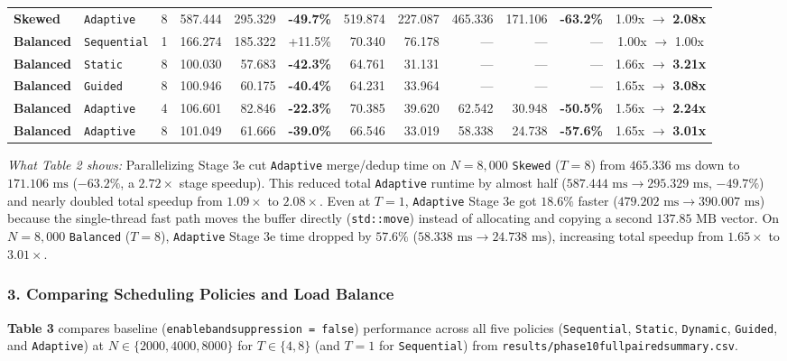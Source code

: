 \documentclass[11pt,a4paper]{article}
\renewcommand{\_}{\textunderscore\allowbreak}
\begin{document}
\begin{table}[H]
{\begin{tabular}{l l r r r r r r r r r c}
\textbf{Skewed} & \texttt{Adaptive} & 8 & 587.444 & 295.329 & \textbf{-49.7\%} & 519.874 & 227.087 & 465.336 & 171.106 & \textbf{-63.2\%} & 1.09x $\to$ \textbf{2.08x} \\
\textbf{Balanced} & \texttt{Sequential} & 1 & 166.274 & 185.322 & +11.5\% & 70.340 & 76.178 & --- & --- & --- & 1.00x $\to$ 1.00x \\
\textbf{Balanced} & \texttt{Static} & 8 & 100.030 & 57.683 & \textbf{-42.3\%} & 64.761 & 31.131 & --- & --- & --- & 1.66x $\to$ \textbf{3.21x} \\
\textbf{Balanced} & \texttt{Guided} & 8 & 100.946 & 60.175 & \textbf{-40.4\%} & 64.231 & 33.964 & --- & --- & --- & 1.65x $\to$ \textbf{3.08x} \\
\textbf{Balanced} & \texttt{Adaptive} & 4 & 106.601 & 82.846 & \textbf{-22.3\%} & 70.385 & 39.620 & 62.542 & 30.948 & \textbf{-50.5\%} & 1.56x $\to$ \textbf{2.24x} \\
\textbf{Balanced} & \texttt{Adaptive} & 8 & 101.049 & 61.666 & \textbf{-39.0\%} & 66.546 & 33.019 & 58.338 & 24.738 & \textbf{-57.6\%} & 1.65x $\to$ \textbf{3.01x} \\
\bottomrule
\end{tabular}%
}
\end{table}

\textit{What Table 2 shows:} Parallelizing Stage 3e cut \texttt{Adaptive} merge/dedup time on $N=8,000$ \texttt{Skewed} ($T=8$) from $465.336\text{ ms}$ down to $171.106\text{ ms}$ ($-63.2\%$, a $2.72\times$ stage speedup). This reduced total \texttt{Adaptive} runtime by almost half ($587.444\text{ ms} \to 295.329\text{ ms}$, $-49.7\%$) and nearly doubled total speedup from $1.09\times$ to $2.08\times$. Even at $T=1$, \texttt{Adaptive} Stage 3e got $18.6\%$ faster ($479.202\text{ ms} \to 390.007\text{ ms}$) because the single-thread fast path moves the buffer directly (\texttt{std::move}) instead of allocating and copying a second $137.85\text{ MB}$ vector. On $N=8,000$ \texttt{Balanced} ($T=8$), \texttt{Adaptive} Stage 3e time dropped by $57.6\%$ ($58.338\text{ ms} \to 24.738\text{ ms}$), increasing total speedup from $1.65\times$ to $3.01\times$.

\subsubsection*{3. Comparing Scheduling Policies and Load Balance}
\textbf{Table 3} compares baseline (\texttt{enable\_band\_suppression = false}) performance across all five policies (\texttt{Sequential}, \texttt{Static}, \texttt{Dynamic}, \texttt{Guided}, and \texttt{Adaptive}) at $N \in \{2000, 4000, 8000\}$ for $T \in \{4, 8\}$ (and $T=1$ for \texttt{Sequential}) from \texttt{results/phase10\_full\_paired\_summary.csv}.
\end{document}
